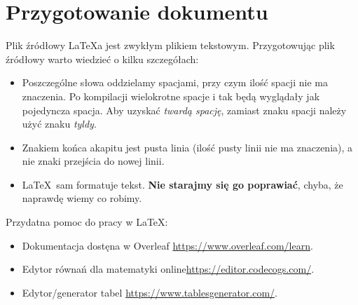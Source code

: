 
\section{Przygotowanie dokumentu}
\label{sec:przygotowanieDokumentu}

Plik źródłowy \LaTeX a jest zwykłym plikiem tekstowym. Przygotowując plik
źródłowy warto wiedzieć o kilku szczegółach:

\begin{itemize}
      \item
            Poszczególne słowa oddzielamy spacjami, przy czym ilość spacji nie ma znaczenia.
            Po kompilacji wielokrotne spacje i tak będą wyglądały jak pojedyncza spacja.
            Aby uzyskać {\em twardą spację}, zamiast znaku spacji należy użyć znaku {\em
                        tyldy}.

      \item
            Znakiem końca akapitu jest pusta linia (ilość pusty linii nie ma znaczenia), a
            nie znaki przejścia do nowej linii.

      \item
            \LaTeX~sam formatuje tekst. \textbf{Nie starajmy się go poprawiać}, chyba, że
            naprawdę wiemy co robimy.
\end{itemize}


\noindent Przydatna pomoc do pracy w \LaTeX:
\begin{itemize}
      \item Dokumentacja dostęna w Overleaf \url{https://www.overleaf.com/learn}.
      \item Edytor równań dla matematyki online\url{https://editor.codecogs.com/}.
      \item  Edytor/generator tabel \url{https://www.tablesgenerator.com/}.
\end{itemize}





